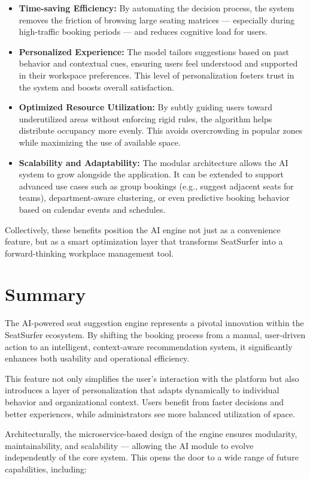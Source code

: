 \documentclass[12pt,a4paper]{report} %
\begin{document}
\begin{itemize}
\item \textbf{Time-saving Efficiency:}
By automating the decision process, the system removes the friction of browsing large seating matrices — especially during high-traffic booking periods — and reduces cognitive load for users.
\item \textbf{Personalized Experience:}  
The model tailors suggestions based on past behavior and contextual cues, ensuring users feel understood and supported in their workspace preferences. This level of personalization fosters trust in the system and boosts overall satisfaction.
\item \textbf{Optimized Resource Utilization:}  
By subtly guiding users toward underutilized areas without enforcing rigid rules, the algorithm helps distribute occupancy more evenly. This avoids overcrowding in popular zones while maximizing the use of available space.
\item \textbf{Scalability and Adaptability:}  
The modular architecture allows the AI system to grow alongside the application. It can be extended to support advanced use cases such as group bookings (e.g., suggest adjacent seats for teams), department-aware clustering, or even predictive booking behavior based on calendar events and schedules.
\end{itemize}

Collectively, these benefits position the AI engine not just as a convenience feature, but as a smart optimization layer that transforms SeatSurfer into a forward-thinking workplace management tool.

\section{Summary}

The AI-powered seat suggestion engine represents a pivotal innovation within the SeatSurfer ecosystem. By shifting the booking process from a manual, user-driven action to an intelligent, context-aware recommendation system, it significantly enhances both usability and operational efficiency.

This feature not only simplifies the user's interaction with the platform but also introduces a layer of personalization that adapts dynamically to individual behavior and organizational context. Users benefit from faster decisions and better experiences, while administrators see more balanced utilization of space.

Architecturally, the microservice-based design of the engine ensures modularity, maintainability, and scalability — allowing the AI module to evolve independently of the core system. This opens the door to a wide range of future capabilities, including:
\end{document}
